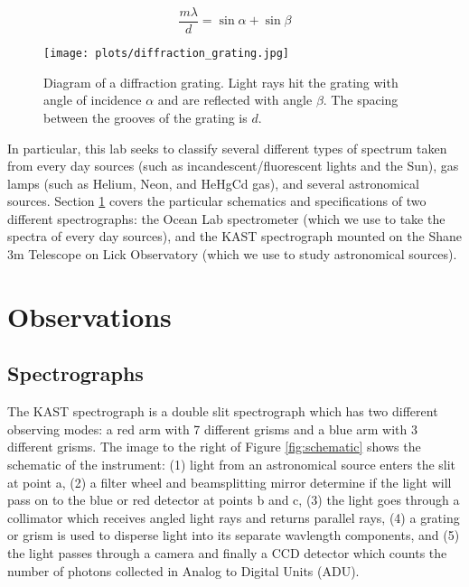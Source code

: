 \documentclass[preprint]{aastex62}
\begin{document}
\begin{equation}
    \frac{m\lambda}{d} = \sin\alpha + \sin\beta
\end{equation}

\begin{figure}[h]
\begin{center}
\texttt{[image: plots/diffraction\_grating.jpg]}
\caption{Diagram of a diffraction grating. Light rays hit the grating with angle of incidence $\alpha$ and are reflected with angle $\beta$. The spacing between the grooves of the grating is $d$.} \label{fig:grating}
\end{center}
\end{figure}

In particular, this lab seeks to classify several different types of spectrum taken from every day sources (such as incandescent/fluorescent lights and the Sun), gas lamps (such as Helium, Neon, and HeHgCd gas), and several astronomical sources.
Section \ref{sec:observations} covers the particular schematics and specifications of two different spectrographs: the Ocean Lab spectrometer (which we use to take the spectra of every day sources), and the KAST spectrograph mounted on the Shane 3m Telescope on Lick Observatory (which we use to study astronomical sources). 


\section{Observations} \label{sec:observations}
\subsection{Spectrographs}
The KAST spectrograph is a double slit spectrograph which has two different observing modes: a red arm with 7 different grisms and a blue arm with 3 different grisms. The image to the right of Figure \ref{fig:schematic} shows the schematic of the instrument: (1) light from an astronomical source enters the slit at point a, (2) a filter wheel and beamsplitting mirror determine if the light will pass on to the blue or red detector at points b and c, (3) the light goes through a collimator which receives angled light rays and returns parallel rays, (4) a grating or grism is used to disperse light into its separate wavlength components, and (5) the light passes through a camera and finally a CCD detector which counts the number of photons collected in Analog to Digital Units (ADU).
\end{document}
